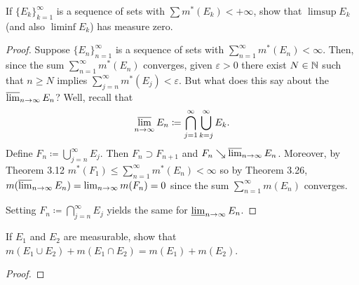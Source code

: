 \begin{problem}
  If ${\{E_k\}}_{k=1}^\infty$ is a sequence of sets with
  $\sum m^*(E_k)<+\infty$, show that $\limsup E_k$ (and also $\liminf E_k$)
  has measure zero.
\end{problem}
\begin{proof}
  Suppose ${\{E_n\}}_{n=1}^\infty$ is a sequence of sets with
  $\sum_{n=1}^\infty m^*(E_n)<\infty$. Then, since the sum
  $\sum_{n=1}^\infty m^*(E_n)$ converges, given $\varepsilon>0$ there
  exist $N\in\mathbb{N}$ such that $n\geq N$ implies
  $\sum_{j=n}^\infty m^*(E_j)<\varepsilon$. But what does this say about
  the $\varlimsup_{n\to\infty} E_n$? Well, recall that
  \[
    \varlimsup_{n\to\infty}
    E_n\coloneq\bigcap_{j=1}^\infty\bigcup_{k=j}^\infty E_k.
  \]
  Define $F_n\coloneq\bigcup_{j=n}^\infty E_j$. Then $F_n\supset F_{n+1}$
  and $F_n\searrow\varlimsup_{n\to\infty} E_n$. Moreover, by Theorem 3.12
  $m^*(F_1)\leq\sum_{n=1}^\infty m^*(E_n)<\infty$ so by Theorem 3.26,
  $m(\varlimsup_{n\to\infty} E_n)=\lim_{n\to\infty}m(F_n)=0$ since the sum
  $\sum_{n=1}^\infty m(E_n)$ converges.

  Setting $F_n\coloneq\bigcap_{j=n}^\infty E_j$ yields the same for
  $\varliminf_{n\to\infty} E_n$.
\end{proof}

\begin{problem}
  If $E_1$ and $E_2$ are measurable, show that
  $m(E_1\cup E_2)+m(E_1\cap E_2)=m(E_1)+m(E_2)$.
\end{problem}
\begin{proof}
\end{proof}

